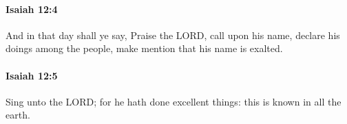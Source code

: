 		\paragraph{Isaiah 12:4} %
			\label{ISAIAH-12-4}

			And in that day shall ye say, Praise the LORD, call upon his name, declare his doings among the people, make mention that his name is exalted.


		\paragraph{Isaiah 12:5} %
			\label{ISAIAH-12-5}

			Sing unto the LORD; for he hath done excellent things: this is known in all the earth.


